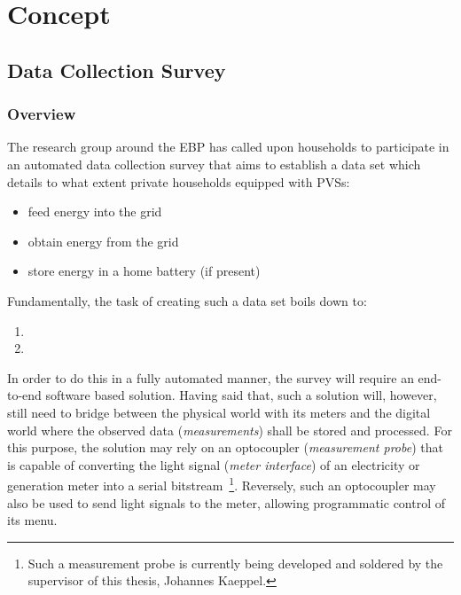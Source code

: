 
\chapter{Concept}
\label{chp:concept}

\section{Data Collection Survey}
\label{sec:data-collection-survey}

\subsection{Overview}
\label{sec:survey-overview}

The research group around the \ac{EBP} has called upon households to participate in an automated data collection survey that aims to establish a data set which details to what extent private households equipped with \acsp{PVS}:

\begin{itemize}
  \item feed energy into the grid
  \item obtain energy from the grid
  \item store energy in a home battery (if present)
\end{itemize}

Fundamentally, the task of creating such a data set boils down to:


\begin{enumerate}[label=(\Alph*)]
  \item {}
  \item {}
\end{enumerate}

In order to do this in a fully automated manner, the survey will require an end-to-end software based solution. Having said that, such a solution will, however, still need to bridge between the physical world with its meters and the digital world where the observed data (\textit{measurements}) shall be stored and processed. For this purpose, the solution may rely on an optocoupler (\textit{measurement probe}) that is capable of converting the light signal (\textit{meter interface}) of an electricity or generation meter into a serial bitstream~\footnote{Such a measurement probe is currently being developed and soldered by the supervisor of this thesis, Johannes Kaeppel.}. Reversely, such an optocoupler may also be used to send light signals to the meter, allowing programmatic control of its menu.

